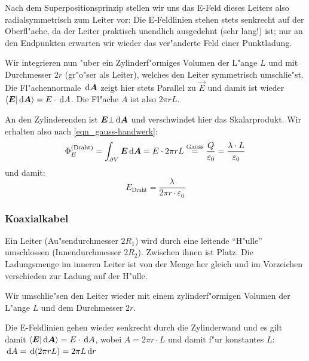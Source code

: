 Nach dem Superpositionsprinzip stellen wir uns das E-Feld dieses
Leiters also radialsymmetrisch zum Leiter vor: Die E-Feldlinien stehen
stets senkrecht auf der Oberfl"ache, da der Leiter praktisch unendlich
ausgedehnt (sehr lang!) ist; nur an den Endpunkten erwarten wir wieder
das ver"anderte Feld einer Punktladung.

Wir integrieren nun "uber ein Zylinderf"ormiges Volumen der L"ange $L$
und mit Durchmesser $2r$ (gr"o"ser als Leiter), welches den Leiter
symmetrisch umschlie"st. Die Fl"achennormale $\, \mathrm{d} \boldsymbol{A}$ zeigt hier
stets Parallel zu $\vec E$ und damit ist wieder $\langle \boldsymbol{E} |\, \mathrm{d}
\boldsymbol{A} \rangle = E \cdot \, \mathrm{d} A$. Die Fl"ache $A$ ist also $2\pi r L$.

An den Zylinderenden ist $\boldsymbol{E} \bot \, \mathrm{d} \boldsymbol{A}$ und verschwindet
hier das Skalarprodukt. Wir erhalten also nach
\eqref{eqn_gauss-handwerk}:
\begin{equation}
   \label{eqn_differenz-c10}
   \Phi_E^{(\text{Draht})} = \int_{\partial V} \boldsymbol{E} \, \mathrm{d} \boldsymbol{A} = E \cdot 2\pi
   r L \stackrel{\text{\textsc{Gauss}}}{=} \frac{Q}{\varepsilon_0} = \frac{\lambda \cdot L}{\varepsilon_0}
\end{equation}
und damit:
\begin{equation}
   \label{eqn_differenz-c11}
   \boxed{E_\text{Draht} = \frac{\lambda}{2 \pi r \cdot
       \varepsilon_0}} 
\end{equation}








\subsubsection{Koaxialkabel}
\label{kap_koaxialkabel}

Ein Leiter (Au"sendurchmesser $2R_1$) wird durch eine leitende
"`H"ulle"' umschlossen (Innendurchmesser $2R_2$). Zwischen ihnen ist
Platz. Die Ladungsmenge im inneren Leiter ist von der Menge her gleich
und im Vorzeichen verschieden zur Ladung auf der H"ulle.

Wir umschlie"sen den Leiter wieder mit einem zylinderf"ormigen Volumen
der L"ange $L$ und dem Durchmesser $2r$.

Die E-Feldlinien gehen wieder senkrecht durch die Zylinderwand und es
gilt damit $\langle \boldsymbol{E} |\, \mathrm{d} \boldsymbol{A}  \rangle = E \cdot \, \mathrm{d} A$,
wobei $A = 2\pi r \cdot L$ und damit f"ur konstantes $L$:
$
\, \mathrm{d} A = \, \mathrm{d} (2\pi r L) = 2 \pi L \, \mathrm{d} r
$


